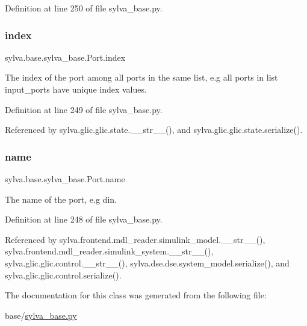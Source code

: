 Definition at line 250 of file sylva\+\_\+base.\+py.

\mbox{\label{classsylva_1_1base_1_1sylva__base_1_1_port_a36d850a63a97265c2a611d2387cf8491}} 
\subsubsection{\texorpdfstring{index}{index}}
{\footnotesize\ttfamily sylva.\+base.\+sylva\+\_\+base.\+Port.\+index}



The index of the port among all ports in the same list, e.\+g all ports in list {\ttfamily input\+\_\+ports} have unique index values. 



Definition at line 249 of file sylva\+\_\+base.\+py.



Referenced by sylva.\+glic.\+glic.\+state.\+\_\+\+\_\+str\+\_\+\+\_\+(), and sylva.\+glic.\+glic.\+state.\+serialize().

\mbox{\label{classsylva_1_1base_1_1sylva__base_1_1_port_a4e52c67462a68c12e544a8e95f065993}} 
\subsubsection{\texorpdfstring{name}{name}}
{\footnotesize\ttfamily sylva.\+base.\+sylva\+\_\+base.\+Port.\+name}



The name of the port, e.\+g {\ttfamily din}. 



Definition at line 248 of file sylva\+\_\+base.\+py.



Referenced by sylva.\+frontend.\+mdl\+\_\+reader.\+simulink\+\_\+model.\+\_\+\+\_\+str\+\_\+\+\_\+(), sylva.\+frontend.\+mdl\+\_\+reader.\+simulink\+\_\+system.\+\_\+\+\_\+str\+\_\+\+\_\+(), sylva.\+glic.\+glic.\+control.\+\_\+\+\_\+str\+\_\+\+\_\+(), sylva.\+dse.\+dse.\+system\+\_\+model.\+serialize(), and sylva.\+glic.\+glic.\+control.\+serialize().



The documentation for this class was generated from the following file\+:\begin{DoxyCompactItemize}
\item 
base/\hyperlink{sylva__base_8py}{sylva\+\_\+base.\+py}\end{DoxyCompactItemize}
